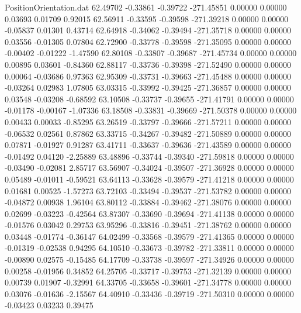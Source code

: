 \begin{filecontents}{PositionOrientation.dat}
  62.49702   -0.33861   -0.39722  -271.45851    0.00000    0.00000    0.03693    0.01709    0.92015
  62.56911   -0.33595   -0.39598  -271.39218    0.00000    0.00000   -0.05837    0.01301    0.43714
  62.64918   -0.34062   -0.39494  -271.35718    0.00000    0.00000    0.03556   -0.01305    0.07804
  62.72900   -0.33778   -0.39598  -271.35095    0.00000    0.00000   -0.00402   -0.01222   -1.47590
  62.80108   -0.33807   -0.39687  -271.45734    0.00000    0.00000    0.00895    0.03601   -0.84360
  62.88117   -0.33736   -0.39398  -271.52490    0.00000    0.00000    0.00064   -0.03686    0.97363
  62.95309   -0.33731   -0.39663  -271.45488    0.00000    0.00000   -0.03264    0.02983    1.07805
  63.03315   -0.33992   -0.39425  -271.36857    0.00000    0.00000    0.03548   -0.03208   -0.68592
  63.10508   -0.33737   -0.39655  -271.41791    0.00000    0.00000   -0.01178   -0.00167   -1.07336
  63.18508   -0.33831   -0.39669  -271.50378    0.00000    0.00000    0.00433    0.00033   -0.85295
  63.26519   -0.33797   -0.39666  -271.57211    0.00000    0.00000   -0.06532    0.02561    0.87862
  63.33715   -0.34267   -0.39482  -271.50889    0.00000    0.00000    0.07871   -0.01927    0.91287
  63.41711   -0.33637   -0.39636  -271.43589    0.00000    0.00000   -0.01492    0.04120   -2.25889
  63.48896   -0.33744   -0.39340  -271.59818    0.00000    0.00000   -0.03490   -0.02081    2.85717
  63.56907   -0.34024   -0.39507  -271.36928    0.00000    0.00000    0.05489   -0.01011   -0.59521
  63.64113   -0.33628   -0.39579  -271.41218    0.00000    0.00000    0.01681    0.00525   -1.57273
  63.72103   -0.33494   -0.39537  -271.53782    0.00000    0.00000   -0.04872    0.00938    1.96104
  63.80112   -0.33884   -0.39462  -271.38076    0.00000    0.00000    0.02699   -0.03223   -0.42564
  63.87307   -0.33690   -0.39694  -271.41138    0.00000    0.00000   -0.01576    0.03042    0.29753
  63.95296   -0.33816   -0.39451  -271.38762    0.00000    0.00000    0.03448   -0.01774   -0.36147
  64.02499   -0.33568   -0.39579  -271.41365    0.00000    0.00000   -0.01319   -0.02538    0.94295
  64.10510   -0.33673   -0.39782  -271.33811    0.00000    0.00000   -0.00890    0.02575   -0.15485
  64.17709   -0.33738   -0.39597  -271.34926    0.00000    0.00000    0.00258   -0.01956    0.34852
  64.25705   -0.33717   -0.39753  -271.32139    0.00000    0.00000    0.00739    0.01907   -0.32991
  64.33705   -0.33658   -0.39601  -271.34778    0.00000    0.00000    0.03076   -0.01636   -2.15567
  64.40910   -0.33436   -0.39719  -271.50310    0.00000    0.00000   -0.03423    0.03233    0.39475

\end{filecontents}
